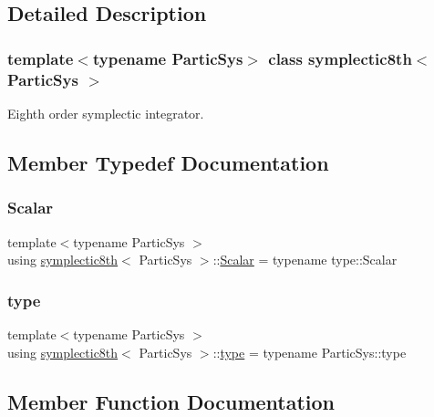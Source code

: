 \subsection{Detailed Description}
\subsubsection*{template$<$typename Partic\+Sys$>$\newline
class symplectic8th$<$ Partic\+Sys $>$}

Eighth order symplectic integrator. 

\subsection{Member Typedef Documentation}
\mbox{\label{classsymplectic8th_a3a85c2b58a75f2da56a6989a73a001b8}} 
\subsubsection{\texorpdfstring{Scalar}{Scalar}}
{\footnotesize\ttfamily template$<$typename Partic\+Sys $>$ \\
using \mbox{\hyperlink{classsymplectic8th}{symplectic8th}}$<$ Partic\+Sys $>$\+::\mbox{\hyperlink{classsymplectic8th_a3a85c2b58a75f2da56a6989a73a001b8}{Scalar}} =  typename type\+::\+Scalar}

\mbox{\label{classsymplectic8th_a9e02e91dadeed454d5e3986f83c489fa}} 
\subsubsection{\texorpdfstring{type}{type}}
{\footnotesize\ttfamily template$<$typename Partic\+Sys $>$ \\
using \mbox{\hyperlink{classsymplectic8th}{symplectic8th}}$<$ Partic\+Sys $>$\+::\mbox{\hyperlink{classsymplectic8th_a9e02e91dadeed454d5e3986f83c489fa}{type}} =  typename Partic\+Sys\+::type}



\subsection{Member Function Documentation}
\mbox{\label{classsymplectic8th_a6d3406699e9edfe9fe0791821b719fe0}} 
